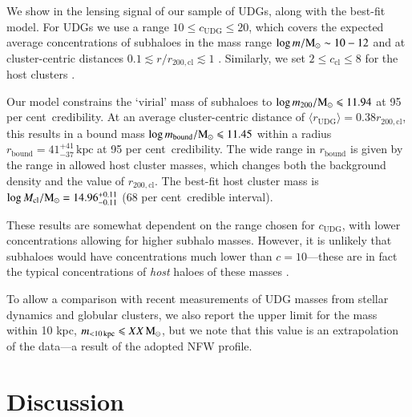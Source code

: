 \documentclass[usenatbib,fleqn]{mnras}
\def\udg{\mathrm{UDG}}
\def\bound{\mathrm{bound}}
\def\Mcl{M_\mathrm{cl}}
\def\percent{ per cent}
\begin{document}
We show in  the lensing signal of our sample of UDGs, along with the best-fit model. For UDGs we use a range $10 \leq c_\udg \leq 20$, which covers the expected average concentrations of subhaloes in the mass range $\log m/\mathrm{M}_\odot \sim 10-12$ and at cluster-centric distances $0.1\lesssim r/r_\mathrm{200,cl} \lesssim 1$ \citep{moline16}. Similarly, we set $2 \leq c_\mathrm{cl} \leq 8$ for the host clusters \citep[e.g.,][]{dutton14}.

Our model constrains the `virial' mass of subhaloes to $\log m_{200}/\mathrm{M}_\odot\leqslant11.94$ at 95\percent\ credibility. At an average cluster-centric distance of $\langle r_\udg \rangle=0.38r_\mathrm{200,cl}$, this results in a bound mass $\log m_\bound/\Msun\leq 11.45$ within a radius $r_\bound=41_{-37}^{+41}\,\mathrm{kpc}$ at 95\percent\ credibility. The wide range in $r_\bound$ is given by the range in allowed host cluster masses, which changes both the background density and the value of $r_\mathrm{200,cl}$. The best-fit host cluster mass is $\log\Mcl/\Msun=14.96_{-0.11}^{+0.11}$ (68\percent\ credible interval).

These results are somewhat dependent on the range chosen for $c_\udg$, with lower concentrations allowing for higher subhalo masses. However, it is unlikely that subhaloes would have concentrations much lower than $c=10$---these are in fact the typical concentrations of \emph{host} haloes of these masses \citep[e.g.,][]{dutton14,moline16}.

To allow a comparison with recent measurements of UDG masses from stellar dynamics and globular clusters, we also report the upper limit for the mass within 10 kpc, $m_\mathrm{<10\,kpc}\leqslant XX\,\mathrm{M}_\odot$, but we note that this value is an extrapolation of the data---a result of the adopted NFW profile.



\section{Discussion}
\label{s:discussion}
 
\end{document}
